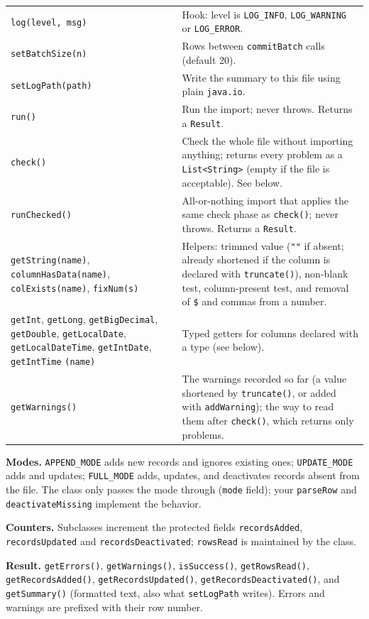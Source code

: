 \begin{longtable}{P{5.0cm}P{5.5cm}}
\texttt{log(level, msg)} & Hook: level is \texttt{LOG\_INFO}, \texttt{LOG\_WARNING} or \texttt{LOG\_ERROR}. \\
\texttt{setBatchSize(n)} & Rows between \texttt{commitBatch} calls (default 20). \\
\texttt{setLogPath(path)} & Write the summary to this file using plain \texttt{java.io}. \\
\texttt{run()} & Run the import; never throws.  Returns a \texttt{Result}. \\
\texttt{check()} & Check the whole file without importing anything; returns every problem as a \texttt{List<String>} (empty if the file is acceptable).  See below. \\
\texttt{runChecked()} & All-or-nothing import that applies the same check phase as \texttt{check()}; never throws.  Returns a \texttt{Result}. \\
\texttt{getString(name)}, \texttt{columnHasData(}\allowbreak\texttt{name)}, \texttt{colExists(name)}, \texttt{fixNum(s)} & Helpers: trimmed value (\texttt{""} if absent; already shortened if the column is declared with \texttt{truncate()}), non-blank test, column-present test, and removal of \texttt{\$} and commas from a number. \\
\texttt{getInt}, \texttt{getLong}, \texttt{getBigDecimal}, \texttt{getDouble}, \texttt{getLocalDate}, \texttt{getLocalDateTime}, \texttt{getIntDate}, \texttt{getIntTime} \texttt{(name)} & Typed getters for columns declared with a type (see below). \\
\texttt{getWarnings()} & The warnings recorded so far (a value shortened by \texttt{truncate()}, or added with \texttt{addWarning}); the way to read them after \texttt{check()}, which returns only problems. \\
\bottomrule
\end{longtable}

\textbf{Modes.}  \texttt{APPEND\_MODE} adds new records and ignores existing ones; \texttt{UPDATE\_MODE} adds and updates; \texttt{FULL\_MODE} adds, updates, and deactivates records absent from the file.  The class only passes the mode through (\texttt{mode} field); your \texttt{parseRow} and \texttt{deactivateMissing} implement the behavior.

\textbf{Counters.}  Subclasses increment the protected fields \texttt{recordsAdded}, \texttt{recordsUpdated} and \texttt{recordsDeactivated}; \texttt{rowsRead} is maintained by the class.

\textbf{Result.}  \texttt{getErrors()}, \texttt{getWarnings()}, \texttt{isSuccess()}, \texttt{getRowsRead()}, \texttt{getRecordsAdded()}, \texttt{getRecordsUpdated()}, \texttt{get\-Records\-Deactivated()}, and \texttt{getSummary()} (formatted text, also what \texttt{setLogPath} writes).  Errors and warnings are prefixed with their row number.

